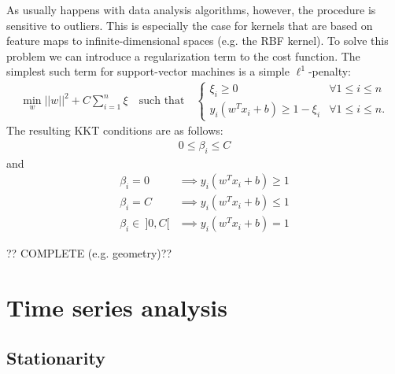 {    As usually happens with data analysis algorithms, however, the procedure is sensitive to outliers. This is especially the case for kernels that are based on feature maps to infinite-dimensional spaces (e.g. the RBF kernel). To solve this problem we can introduce a regularization term to the cost function. The simplest such term for support-vector machines is a simple $\ell^1$-penalty:
    \begin{gather}
        \min_w ||w||^2 + C\sum_{i=1}^n\xi\quad\text{such that}\quad
        \begin{cases}
            \xi_i\geq0&\forall 1\leq i\leq n\\
            y_i(w^Tx_i+b)\geq1-\xi_i&\forall 1\leq i\leq n.
        \end{cases}
    \end{gather}
    The resulting KKT conditions are as follows:
    \begin{gather}
        0\leq\beta_i\leq C
    \end{gather}
    and
    \begin{align}
        \beta_i = 0&\implies y_i(w^Tx_i+b)\geq1\\
        \beta_i = C&\implies y_i(w^Tx_i+b)\leq1\\
        \beta_i \in\ ]0, C[&\implies y_i(w^Tx_i+b)=1
    \end{align}

    ?? COMPLETE (e.g. geometry)??

\section{Time series analysis}
\subsection{Stationarity}



}
